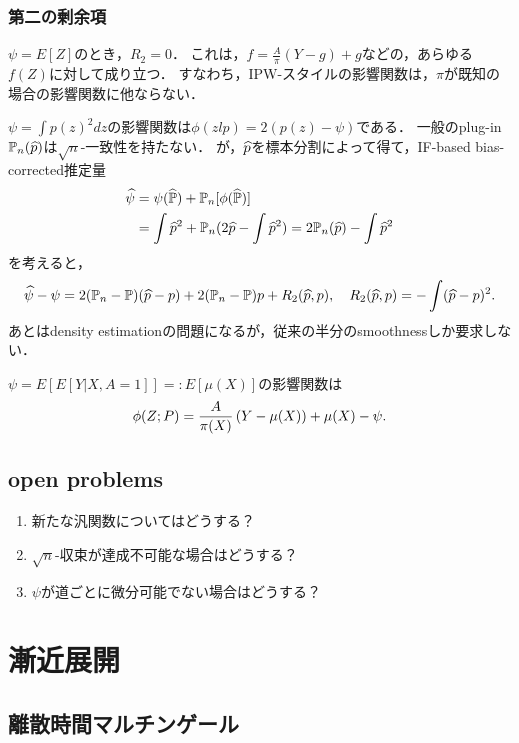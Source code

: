 \documentclass[uplatex,dvipdfmx]{jsreport}
\begin{document}
\subsection{第二の剰余項}

\begin{example}
    $\psi=E[Z]$のとき，$R_2=0$．
    これは，$f=\frac{A}{\pi}(Y-g)+g$などの，あらゆる$f(Z)$に対して成り立つ．
    すなわち，IPW-スタイルの影響関数は，$\pi$が既知の場合の影響関数に他ならない．
\end{example}

\begin{example}
    $\psi=\int p(z)^2dz$の影響関数は$\phi(zlp)=2(p(z)-\psi)$である．
    一般のplug-in $\mathbb{P}_n(\widehat{p})$は$\sqrt{n}$-一致性を持たない．
    が，$\widehat{p}$を標本分割によって得て，IF-based bias-corrected推定量
    \begin{align*}
        \widehat{\psi}&=\psi(\widehat{\mathbb{P}})+\mathbb{P}_n[\phi(\widehat{\mathbb{P}})]\\
        &=\int\widehat{p}^2+\mathbb{P}_n(2\widehat{p}-\int\widehat{p}^2)=2\mathbb{P}_n(\widehat{p})-\int\widehat{p}^2
    \end{align*}
    を考えると，
    \[\widehat{\psi}-\psi=2(\mathbb{P}_n-\mathbb{P})(\widehat{p}-p)+2(\mathbb{P}_n-\mathbb{P})p+R_2(\widehat{p},p),\quad R_2(\widehat{p},p)=-\int(\widehat{p}-p)^2.\]
    あとはdensity estimationの問題になるが，従来の半分のsmoothnessしか要求しない．
\end{example}

\begin{example}
    $\psi=E[E[Y|X,A=1]]=:E[\mu(X)]$の影響関数は
    \[\phi(Z;P)=\frac{A}{\pi(X)}\left(Y-\mu(X)\right)+\mu(X)-\psi.\]
\end{example}

\section{open problems}

\begin{enumerate}
    \item 新たな汎関数についてはどうする？
    \item $\sqrt{n}$-収束が達成不可能な場合はどうする？
    \item $\psi$が道ごとに微分可能でない場合はどうする？
\end{enumerate}

\chapter{漸近展開}

\section{離散時間マルチンゲール}
\end{document}
